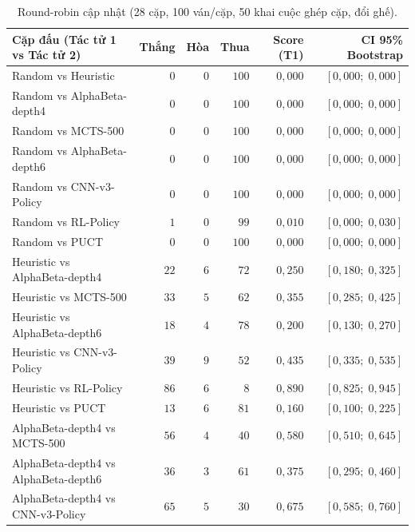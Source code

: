 \documentclass[11pt, a4paper]{article}
\begin{document}
\begin{table}[H]
    \centering
    \small
    \caption{Round-robin cập nhật (28 cặp, 100 ván/cặp, 50 khai cuộc ghép cặp, đổi ghế).}
    \label{tab:official_round_robin}
    \begin{tabular}{@{} l r r r r r @{}}
        \toprule
        \textbf{Cặp đấu (Tác tử 1 vs Tác tử 2)} & \textbf{Thắng} & \textbf{Hòa} & \textbf{Thua} & \textbf{Score (T1)} & \textbf{CI 95\% Bootstrap} \\
        \midrule
        Random vs Heuristic & $0$ & $0$ & $100$ & $0{,}000$ & $[0{,}000;\; 0{,}000]$ \\
        Random vs AlphaBeta-depth4 & $0$ & $0$ & $100$ & $0{,}000$ & $[0{,}000;\; 0{,}000]$ \\
        Random vs MCTS-500 & $0$ & $0$ & $100$ & $0{,}000$ & $[0{,}000;\; 0{,}000]$ \\
        Random vs AlphaBeta-depth6 & $0$ & $0$ & $100$ & $0{,}000$ & $[0{,}000;\; 0{,}000]$ \\
        Random vs CNN-v3-Policy & $0$ & $0$ & $100$ & $0{,}000$ & $[0{,}000;\; 0{,}000]$ \\
        Random vs RL-Policy & $1$ & $0$ & $99$ & $0{,}010$ & $[0{,}000;\; 0{,}030]$ \\
        Random vs PUCT & $0$ & $0$ & $100$ & $0{,}000$ & $[0{,}000;\; 0{,}000]$ \\
        \midrule
        Heuristic vs AlphaBeta-depth4 & $22$ & $6$ & $72$ & $0{,}250$ & $[0{,}180;\; 0{,}325]$ \\
        Heuristic vs MCTS-500 & $33$ & $5$ & $62$ & $0{,}355$ & $[0{,}285;\; 0{,}425]$ \\
        Heuristic vs AlphaBeta-depth6 & $18$ & $4$ & $78$ & $0{,}200$ & $[0{,}130;\; 0{,}270]$ \\
        Heuristic vs CNN-v3-Policy & $39$ & $9$ & $52$ & $0{,}435$ & $[0{,}335;\; 0{,}535]$ \\
        Heuristic vs RL-Policy & $86$ & $6$ & $8$ & $0{,}890$ & $[0{,}825;\; 0{,}945]$ \\
        Heuristic vs PUCT & $13$ & $6$ & $81$ & $0{,}160$ & $[0{,}100;\; 0{,}225]$ \\
        \midrule
        AlphaBeta-depth4 vs MCTS-500 & $56$ & $4$ & $40$ & $0{,}580$ & $[0{,}510;\; 0{,}645]$ \\
        AlphaBeta-depth4 vs AlphaBeta-depth6 & $36$ & $3$ & $61$ & $0{,}375$ & $[0{,}295;\; 0{,}460]$ \\
        AlphaBeta-depth4 vs CNN-v3-Policy & $65$ & $5$ & $30$ & $0{,}675$ & $[0{,}585;\; 0{,}760]$ \\

\end{tabular}
\end{table}
\end{document}
